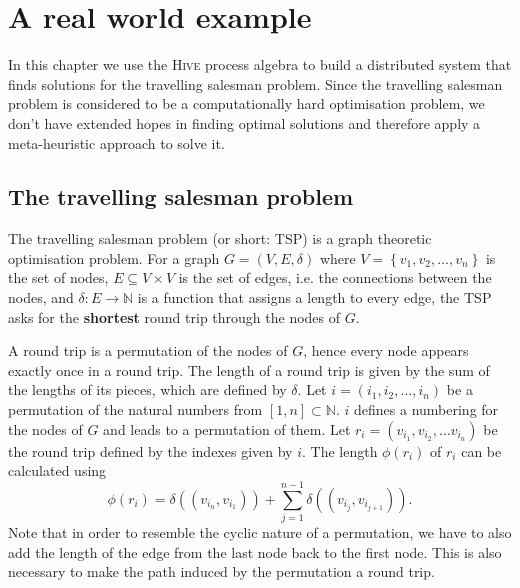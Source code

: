 \chapter{A real world example}
In this chapter we use the \textsc{Hive} process algebra to build a distributed system that finds solutions for the travelling salesman problem. Since the travelling salesman problem is considered to be a computationally hard optimisation problem, we don't have extended hopes in finding optimal solutions and therefore apply a meta-heuristic approach to solve it.

\section{The travelling salesman problem}
\label{chp:tsp}
The travelling salesman problem (or short: \textsc{TSP}) is a graph theoretic optimisation problem. For a graph $G = \left( V, E, \delta \right)$ where $V = \left\{ v_1, v_2, \ldots, v_n \right\}$ is the set of nodes, $E \subseteq V \times V$ is the set of edges, i.e. the connections between the nodes, and $\delta \colon E \to \mathbb{N}$ is a function that assigns a length to every edge, the \textsc{TSP} asks for the \textbf{shortest} round trip through the nodes of $G$.



A round trip is a permutation of the nodes of $G$, hence every node appears exactly once in a round trip. The length of a round trip is given by the sum of the lengths of its pieces, which are defined by $\delta$. Let $i = \left( i_1, i_2, \ldots, i_n \right)$ be a permutation of the natural numbers from $[1, n] \subset \mathbb{N}$. $i$ defines a numbering for the nodes of $G$ and leads to a permutation of them. Let $r_i = \left( v_{i_1}, v_{i_2}, \ldots v_{i_n} \right)$ be the round trip defined by the indexes given by $i$. The length $\phi \left( r_i \right)$ of $r_i$ can be calculated using
\begin{equation}
  \label{eqn:length_roundtrip}
  \phi \left( r_i \right) = \delta \left( \left( v_{i_n}, v_{i_1} \right) \right) + \sum_{j=1}^{n-1} \delta \left( \left( v_{i_j}, v_{i_{j+1}} \right) \right).
\end{equation}
Note that in order to resemble the cyclic nature of a permutation, we have to also add the length of the edge from the last node back to the first node. This is also necessary to make the path induced by the permutation a round trip.

